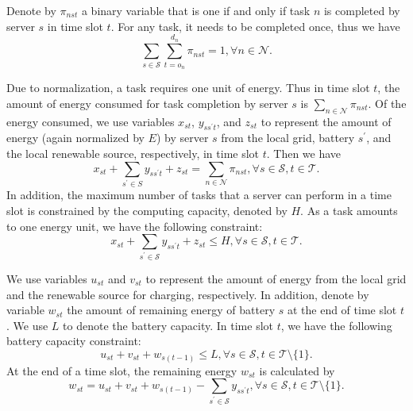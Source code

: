 \documentclass[conference, 10pt, ﬁnal, letterpaper, twocolumn]{IEEEtran}
\begin{document}
Denote by $\pi_{nst}$ a binary variable that is one if and only if task $n$ is completed by server $s$ in time slot $t$. For any task, it needs to be completed once, thus we have
\begin{equation}\label{c0}
    \sum_{s \in \mathcal{S}} \sum^{d_n}_{t = o_n} \pi_{nst} = 1, \forall n \in \mathcal{N}.
\end{equation}

Due to normalization, a task requires one unit of energy. Thus in time slot $t$, the amount of energy consumed for task completion by server $s$ is $\sum_{n \in \mathcal{N}} \pi_{nst}$. Of the energy consumed, we use variables $x_{st}$, $y_{ss^\prime t}$, and $z_{st}$ to represent the amount of energy (again normalized by $E$) by server $s$ from the local grid, battery $s^\prime$, and the local renewable source, respectively, in time slot $t$. Then we have
\begin{equation}\label{c1}
     x_{st} + \sum_{s^\prime \in S}  y _{ss^\prime t} + z_{st} = \sum_{n \in \mathcal{N}} \pi_{nst}, \forall s \in \mathcal{S}, t \in \mathcal{T}.
\end{equation}
In addition, the maximum number of tasks that a server can perform in a time slot is constrained by the computing capacity, denoted by $H$. As a task amounts to one energy unit, we have the following constraint:
\begin{equation}\label{c4}
    x_{st}+\sum_{s^\prime \in\mathcal{S}} y_{ss^\prime t} +z_{st} \leq H, \forall s \in \mathcal{S}, t \in \mathcal{T}.
\end{equation}

We use variables $u_{st}$ and $v_{st}$ to represent the amount of energy from the local grid and the renewable source for charging, respectively. In addition, denote by variable $w_{st}$ the amount of remaining energy of battery $s$ at the end of time slot $t$. We use $L$ to denote the battery capacity. In time slot $t$, we have the following battery capacity constraint:
\begin{equation}\label{c2}
    u_{st} + v_{st} + w_{s(t-1)} \leq L, \forall s \in \mathcal{S}, t \in \mathcal{T} \setminus \{1\}.
\end{equation}
At the end of a time slot, the remaining energy $w_{st}$ is calculated by
\begin{equation}\label{c3}
    w_{st} = u_{st} + v_{st} + w_{s(t-1)} -\sum_{s^\prime \in \mathcal{S}} y_{ss^\prime t}, \forall s \in \mathcal{S}, t \in \mathcal{T} \setminus \{1\}.
\end{equation}
\end{document}
